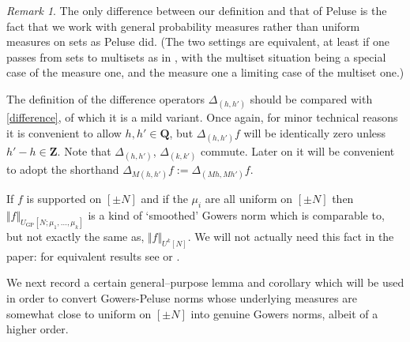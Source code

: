 \documentclass[11pt,reqno]{amsart}
\numberwithin{equation}{section}
\theoremstyle{definition}
\theoremstyle{remark}
\newtheorem*{remark}{Remark}
\newcommand\Z{\mathbf{Z}}
\newcommand\Q{\mathbf{Q}}
\newcommand\GP{\operatorname{GP}}
\begin{document}
\begin{remark}
 The only difference between our definition and that of Peluse is the fact that we work with general probability measures rather than uniform measures on sets as Peluse did. (The two settings are equivalent, at least if one passes from sets to multisets as in \cite{KKL24}, with the multiset situation being a special case of the measure one, and the measure one a limiting case of the multiset one.) 

The definition of the difference operators $\Delta_{(h,h')}$ should be compared with \cref{difference}, of which it is a mild variant. Once again, for minor technical reasons it is convenient to allow $h,h' \in \Q$, but $\Delta_{(h,h')} f$ will be identically zero unless $h' - h \in \Z$. Note that $\Delta_{(h,h')}$, $\Delta_{(k,k')}$ commute. Later on it will be convenient to adopt the shorthand $\Delta_{M(h,h')}f := \Delta_{(Mh, Mh')}f$.

If $f$ is supported on $[\pm N]$ and if the $\mu_i$ are all uniform on $[\pm N]$ then $\Vert f \Vert_{U_{\GP}[N; \mu_1,\dots, \mu_k]}$ is a kind of `smoothed' Gowers norm which is comparable to, but not exactly the same as, $\Vert f \Vert_{U^{k}[N]}$. We will not actually need this fact in the paper: for equivalent results see \cite[Lemma~C.3]{PSS23} or \cite[Lemma~A.3]{KKL24b}.
\end{remark}


We next record a certain general--purpose lemma and corollary which will be used in order to convert Gowers-Peluse norms whose underlying measures are somewhat close to uniform on $[\pm N]$ into genuine Gowers norms, albeit of a higher order.
\end{document}
